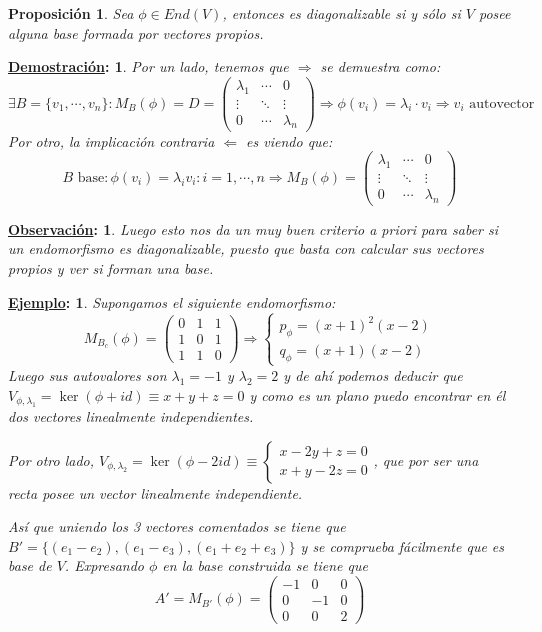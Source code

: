 \documentclass[10pt,a4paper,openright]{book}
\theoremstyle{break}
\newtheorem*{prop}{Proposición}
\newtheorem*{demo}{\underline{Demostración}:}
\newtheorem*{obs}{\underline{Observación}:}
\newtheorem*{ej}{\underline{Ejemplo}:}
\begin{document}
\begin{prop}
Sea $\phi\in End(V)$, entonces es diagonalizable si y sólo si $V$ posee alguna base formada por vectores propios.
\end{prop}
\begin{demo}
Por un lado, tenemos que $\Rightarrow$ se demuestra como:
$$\exists B=\{v_1, \cdots, v_n\} : M_B(\phi)=D=\begin{pmatrix}
\lambda_1 & \cdots & 0 \\
\vdots & \ddots & \vdots \\
0 & \cdots & \lambda_n
\end{pmatrix}\Rightarrow \phi(v_i)=\lambda_i \cdot v_i\Rightarrow v_i \mbox{ autovector}$$
Por otro, la implicación contraria $\Leftarrow$ es viendo que:
$$B\mbox{ base}: \phi(v_i)=\lambda_iv_i: i=1,\cdots, n\Rightarrow M_B(\phi)=\begin{pmatrix}
\lambda_1 & \cdots & 0 \\
\vdots & \ddots & \vdots \\
0 & \cdots & \lambda_n
\end{pmatrix}$$
\end{demo}

\begin{obs}
Luego esto nos da un muy buen criterio a priori para saber si un endomorfismo es diagonalizable, puesto que basta con calcular sus vectores propios y ver si forman una base.
\end{obs}

\begin{ej}
Supongamos el siguiente endomorfismo:
$$M_{B_c}(\phi)=\begin{pmatrix} 0&1&1\\1&0&1\\1&1&0 \end{pmatrix} \Rightarrow \begin{cases}
p_\phi= (x+1)^2(x-2) \\ q_\phi=(x+1)(x-2)
\end{cases}$$
Luego sus autovalores son $\lambda_1 = -1$ y $\lambda_2 = 2$ y de ahí podemos deducir que $V_{\phi, \lambda_1}= \ker(\phi+id) \equiv x+y+z=0$ y como es un plano puedo encontrar en él dos vectores linealmente independientes.

Por otro lado, $V_{\phi,\lambda_2}=\ker(\phi-2id)\equiv \begin{cases}x-2y+z=0 \\ x+y-2z=0\end{cases}$, que por ser una recta posee un vector linealmente independiente.

Así que uniendo los 3 vectores comentados se tiene que $B'=\{(e_1-e_2), (e_1-e_3), (e_1+e_2+e_3)\}$ y se comprueba fácilmente que es base de $V$. Expresando $\phi$ en la base construida se tiene que
$$A'=M_{B'}(\phi)=\begin{pmatrix}-1&0&0\\0&-1&0\\0&0&2\end{pmatrix}$$
\end{ej}
\end{document}
